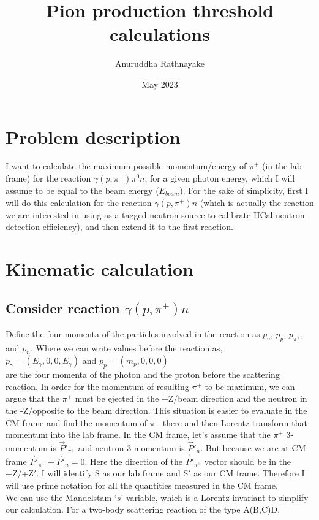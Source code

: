 \documentclass[11pt,letterpaper]{article}
\title{Pion production threshold calculations}
\author{Anuruddha Rathnayake}
\date{May 2023}
\begin{document}
\maketitle

\section{Problem description}

I want to calculate the maximum possible momentum/energy of $\pi^+$ (in the lab frame) for the reaction $\gamma(p,\pi^{+})\pi{^0}n$, for a given photon energy, which I will assume to be equal to the beam energy ($E_{beam}$). For the sake of simplicity, first I will do this calculation for the reaction $\gamma(p,\pi^{+})n$ (which is actually the reaction we are interested in using as a tagged neutron source to calibrate HCal neutron detection efficiency), and then extend it to the first reaction.

 \section{Kinematic calculation}

\subsection{Consider reaction $\gamma(p,\pi^{+})n$}

Define the four-momenta of the particles involved in the reaction as $p_{\gamma}$, $p_{p}$, 
$p_{\pi^{+}}$, and $p_{n}$. Where we can write values before the reaction as,\\
$p_{\gamma} = (E_{\gamma}, 0, 0, E_{\gamma})$ and $p_{p} = (m_p, 0, 0, 0)$ \\ are the four momenta of the photon and the proton before the scattering reaction. In order for the momentum of resulting $\pi^+$ to be maximum, we can argue that the $\pi^+$ must be ejected in the +Z/beam direction and the neutron in the -Z/opposite to the beam direction. This situation is easier to evaluate in the CM frame and find the momentum of $\pi^+$ there and then Lorentz transform that momentum into the lab frame. In the CM frame, let's assume that the $\pi^+$ 3-momentum is $\vec{P}'_{\pi^+}$ and neutron 3-momentum is $\vec{P}'_{n}$. But because we are at CM frame $\vec{P}'_{\pi^+}+\vec{P}'_{n}=0$. Here the direction of the $\vec{P}'_{\pi^+}$ vector should be in the +Z/+Z$'$. I will identify S as our lab frame and S$'$ as our CM frame. Therefore I will use prime notation for all the quantities measured in the CM frame.\\
We can use the Mandelstam `$s$' variable, which is a Lorentz invariant to simplify our calculation. 
For a two-body scattering reaction of the type A(B,C)D,\\
\end{document}
